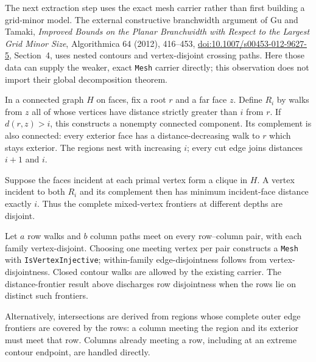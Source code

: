 The next extraction step uses the exact mesh carrier rather than first
building a grid-minor model.  The external constructive branchwidth argument
of Gu and Tamaki, \emph{Improved Bounds on the Planar Branchwidth with
Respect to the Largest Grid Minor Size}, Algorithmica 64 (2012), 416--453,
\href{https://doi.org/10.1007/s00453-012-9627-5}{doi:10.1007/s00453-012-9627-5},
Section~4, uses nested contours and vertex-disjoint crossing paths.  Here
those data can supply the weaker, exact \texttt{Mesh} carrier directly;
this observation does not import their global decomposition theorem.

\begin{proposition}
In a connected graph $H$ on faces, fix a root $r$ and a far face $z$.
Define $R_i$ by walks from $z$ all of whose vertices have distance strictly
greater than $i$ from $r$.  If $d(r,z)>i$, this constructs a nonempty
connected component.  Its complement is also connected: every exterior
face has a distance-decreasing walk to $r$ which stays exterior.
The regions nest with increasing $i$; every cut edge joins distances
$i+1$ and $i$.

Suppose the faces incident at each primal vertex form a clique in $H$.
A vertex incident to both $R_i$ and its complement then has minimum
incident-face distance exactly $i$.  Thus the complete mixed-vertex
frontiers at different depths are disjoint.
\end{proposition}

\begin{proposition}
Let $a$ row walks and $b$ column paths meet on every row--column pair,
with each family vertex-disjoint.  Choosing one meeting vertex per pair
constructs a \texttt{Mesh} with \texttt{IsVertexInjective}; within-family
edge-disjointness follows from vertex-disjointness.  Closed contour walks
are allowed by the existing carrier.  The distance-frontier result above
discharges row disjointness when the rows lie on distinct such frontiers.

Alternatively, intersections are derived from regions whose complete
outer edge frontiers are covered by the rows: a column meeting the region
and its exterior must meet that row.  Columns already meeting a row,
including at an extreme contour endpoint, are handled directly.
\end{proposition}

